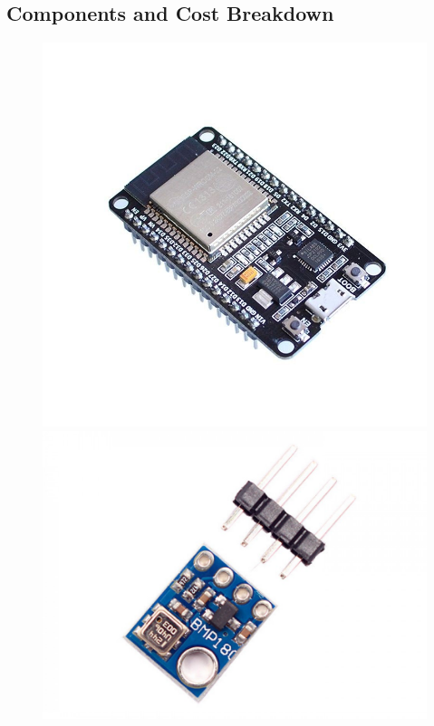 \documentclass[12pt,a4paper]{article}
\begin{document}
\clearpage

\newpage


\subsection{Components and Cost Breakdown}


\begin{figure}[!htb]
    \centering
    \includegraphics[width=0.9\linewidth]{./images/nodemcu.jpg}
    \endminipage\hfill
    \centering
    \includegraphics[width=0.9\linewidth]{./images/bmp180.jpeg}

\end{figure}
\end{document}
